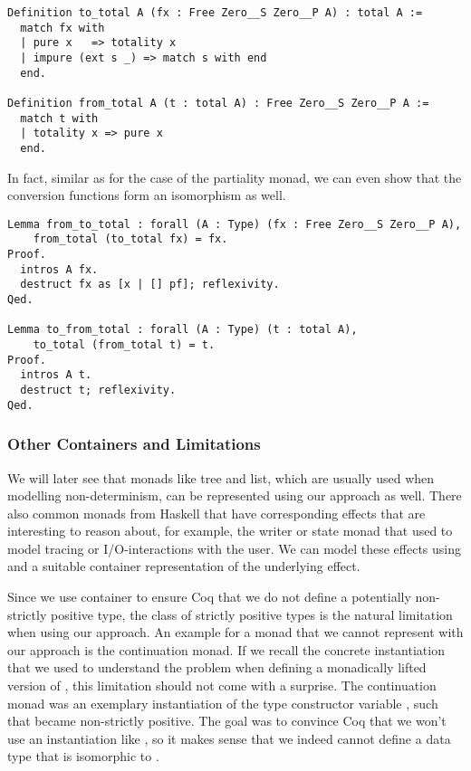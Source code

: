 \begin{verbatim}
Definition to_total A (fx : Free Zero__S Zero__P A) : total A :=
  match fx with
  | pure x   => totality x
  | impure (ext s _) => match s with end
  end.

Definition from_total A (t : total A) : Free Zero__S Zero__P A :=
  match t with
  | totality x => pure x
  end.
\end{verbatim}

\noindent
In fact, similar as for the case of the partiality monad, we can even show that the conversion functions form an isomorphism as well.

\begin{verbatim}
Lemma from_to_total : forall (A : Type) (fx : Free Zero__S Zero__P A),
    from_total (to_total fx) = fx.
Proof.
  intros A fx.
  destruct fx as [x | [] pf]; reflexivity.
Qed.

Lemma to_from_total : forall (A : Type) (t : total A),
    to_total (from_total t) = t.
Proof.
  intros A t.
  destruct t; reflexivity.
Qed.
\end{verbatim}

\subsubsection{Other Containers and Limitations}

We will later see that monads like tree and list, which are usually used when modelling non-determinism, can be represented using our approach as well.
There also common monads from Haskell that have corresponding effects that are interesting to reason about, for example, the writer or state monad that used to model tracing or I/O-interactions with the user.
We can model these effects using  and a suitable container representation of the underlying effect.

Since we use container to ensure Coq that we do not define a potentially non-strictly positive type, the class of strictly positive types is the natural limitation when using our approach.
An example for a monad that we cannot represent with our approach is the continuation monad.
If we recall the concrete instantiation that we used to understand the problem when defining a monadically lifted version of , this limitation should not come with a surprise.
The continuation monad  was an exemplary instantiation of the type constructor variable , such that  became non-strictly positive.
The goal was to convince Coq that we won't use an instantiation like , so it makes sense that we indeed cannot define a data type that is isomorphic to .

